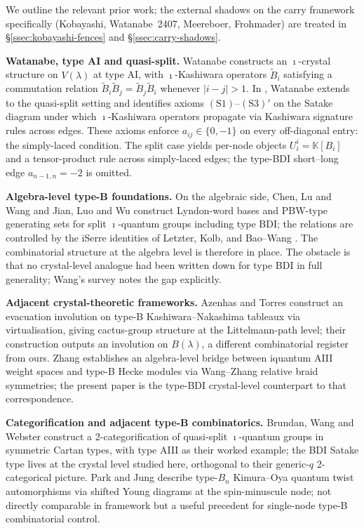 \documentclass[11pt]{article}
\theoremstyle{definition}
\theoremstyle{remark}
\newcommand{\KK}{\mathbb{K}}
\begin{document}
We outline the relevant prior work; the external shadows on the carry framework specifically
(Kobayashi, Watanabe~2407, Meereboer, Frohmader) are treated in \S\ref{ssec:kobayashi-fences}
and \S\ref{ssec:carry-shadows}.

\medskip
\noindent\textbf{Watanabe, type AI and quasi-split.}
Watanabe \cite{Watanabe2107} constructs an $\imath$-crystal structure on $V(\lambda)$ at
type AI, with $\imath$-Kashiwara operators $\widetilde B_i$ satisfying a commutation relation
$\widetilde B_i \widetilde B_j = \widetilde B_j \widetilde B_i$ whenever $|i - j| > 1$.
In \cite{Watanabe2110}, Watanabe extends to the quasi-split setting and identifies axioms
$(\mathrm{S1})$--$(\mathrm{S3})'$ on the Satake diagram under which $\imath$-Kashiwara
operators propagate via Kashiwara signature rules across edges. These axioms enforce $a_{ij}
\in \{0, -1\}$ on every off-diagonal entry: the simply-laced condition. The split case yields
per-node objects $U^i_i = \KK[B_i]$ and a tensor-product rule across simply-laced edges; the
type-BDI short--long edge $a_{n - 1, n} = -2$ is omitted.

\medskip
\noindent\textbf{Algebra-level type-B foundations.}
On the algebraic side, Chen, Lu and Wang \cite{CLW} and Jian, Luo and Wu \cite{JLW} construct
Lyndon-word bases and PBW-type generating sets for split $\imath$-quantum groups including
type BDI; the relations are controlled by the iSerre identities of Letzter, Kolb, and
Bao--Wang \cite{BaoWang}. The combinatorial structure at the algebra level is therefore in
place. The obstacle is that no crystal-level analogue had been written down for type BDI in
full generality; Wang's survey \cite{Wang2024Survey} notes the gap explicitly.

\medskip
\noindent\textbf{Adjacent crystal-theoretic frameworks.}
Azenhas and Torres \cite{AzenhasTorres} construct an evacuation involution on type-B
Kashiwara--Nakashima tableaux via virtualisation, giving cactus-group structure at the
Littelmann-path level; their construction outputs an involution on $B(\lambda)$, a different
combinatorial register from ours. Zhang \cite{Zhang2509} establishes an algebra-level bridge
between iquantum AIII weight spaces and type-B Hecke modules via Wang--Zhang relative braid
symmetries; the present paper is the type-BDI crystal-level counterpart to that
correspondence.

\medskip
\noindent\textbf{Categorification and adjacent type-B combinatorics.}
Brundan, Wang and Webster \cite{BWB2505} construct a 2-categorification of quasi-split
$\imath$-quantum groups in symmetric Cartan types, with type AIII as their worked example;
the BDI Satake type lives at the crystal level studied here, orthogonal to their generic-$q$
2-categorical picture. Park and Jung \cite{ParkJung2507} describe type-$B_n$ Kimura--Oya
quantum twist automorphisms via shifted Young diagrams at the spin-minuscule node; not
directly comparable in framework but a useful precedent for single-node type-B combinatorial
control.
\end{document}
